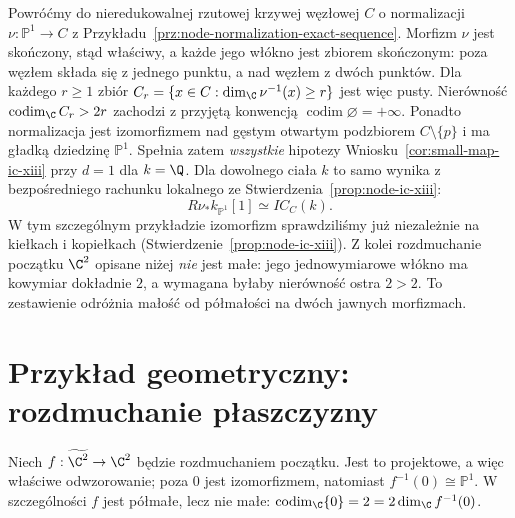 \begin{przyklad}
\label{prz:small-node-normalization}
Powróćmy do nieredukowalnej rzutowej krzywej węzłowej
$C$ o normalizacji
$\nu:\mathbb P^1\to C$ z
Przykładu~\ref{prz:node-normalization-exact-sequence}.
Morfizm $\nu$ jest skończony, stąd właściwy,
a każde jego włókno jest zbiorem skończonym:
poza węzłem składa się z jednego punktu,
a nad węzłem z dwóch punktów.
Dla każdego $r\ge1$ zbiór
$C_r=\{x\in C:\dim_\C\nu^{-1}(x)\ge r\}$
jest więc pusty. Nierówność
$\operatorname{codim}_\C C_r>2r$
zachodzi z przyjętą konwencją
$\operatorname{codim}\varnothing=+\infty$.
Ponadto normalizacja jest izomorfizmem
nad gęstym otwartym podzbiorem
$C\setminus\{p\}$ i ma gładką dziedzinę
$\mathbb P^1$.
Spełnia zatem \emph{wszystkie} hipotezy
Wniosku~\ref{cor:small-map-ic-xiii} przy $d=1$
dla $k=\Q$. Dla dowolnego ciała $k$ to samo
wynika z bezpośredniego rachunku lokalnego
ze Stwierdzenia~\ref{prop:node-ic-xiii}:
\[
 R\nu_*k_{\mathbb P^1}[1]\simeq IC_C(k).
\]
W tym szczególnym przykładzie izomorfizm
sprawdziliśmy już niezależnie na kiełkach
i kopiełkach (Stwierdzenie~\ref{prop:node-ic-xiii}).
Z kolei rozdmuchanie początku $\C^2$ opisane niżej
\emph{nie} jest małe: jego jednowymiarowe włókno
ma kowymiar dokładnie $2$, a wymagana byłaby
nierówność ostra $2>2$.
To zestawienie odróżnia małość od półmałości
na dwóch jawnych morfizmach.
\end{przyklad}

\section{Przykład geometryczny: rozdmuchanie płaszczyzny}
\label{sec:blowup-decomp-xiii}
Niech $f:\widetilde{\C^2}\to\C^2$ będzie
rozdmuchaniem początku. Jest to projektowe,
a więc właściwe odwzorowanie; poza $0$ jest
izomorfizmem, natomiast $f^{-1}(0)\cong\mathbb P^1$.
W szczególności $f$ jest półmałe, lecz nie małe:
$\operatorname{codim}_\C\{0\}=2=2\dim_\C f^{-1}(0)$.

